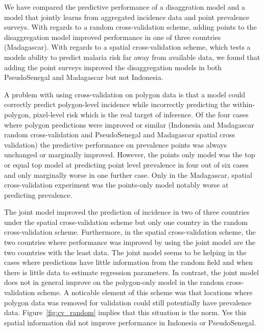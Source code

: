 \documentclass[10pt,letterpaper]{article}
\begin{document}
We have compared the predictive performance of a disaggration model and a model that jointly learns from aggregated incidence data and point prevalence surveys.
With regards to a random cross-validation scheme, adding points to the disaggregation model improved performance in one of three countries (Madagascar).
With regards to a spatial cross-validation scheme, which tests a models ability to predict malaria risk far away from available data, we found that adding the point surveys improved the disaggregation models in both PseudoSenegal and Madagascar but not Indonesia.

A problem with using cross-validation on polygon data is that a model could correctly predict polygon-level incidence while incorrectly predicting the within-polygon, pixel-level risk which is the real target of inference.
Of the four cases where polygon predictions were improved or similar (Indonesia and Madagascar random cross-validation and PseudoSenegal and Madagascar spatial cross validation) the predictive performance on prevalence points was always unchanged or marginally improved.
However, the points only model was the top or equal top model at predicting point level prevalence in four out of six cases and only marginally worse in one further case.
Only in the Madagascar, spatial cross-validation experiment was the points-only model notably worse at predicting prevalence.


The joint model improved the prediction of incidence in two of three countries under the spatial cross-validation scheme but only one country in the random cross-validation scheme.
Furthermore, in the spatial cross-validation scheme, the two countries where performance was improved by using the joint model are the two countries with the least data.
The joint model seems to be helping in the cases where predictions have little information from the random field and when there is little data to estimate regression parameters.
In contrast, the joint model does not in general improve on the polygon-only model in the random cross-validation scheme.
A noticable element of this scheme was that locations where polygon data was removed for validation could still potentially have prevalence data.
Figure~\ref{fig:cv_random} implies that this situation is the norm.
Yes this spatial information did not improve performance in Indonesia or PseudoSenegal.


\end{document}
